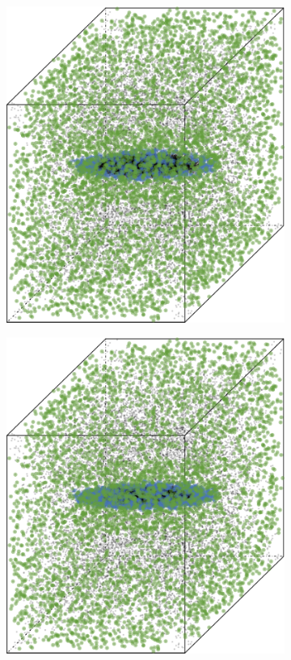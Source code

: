\begin{figure}
\begin{subfigure}{0.23\textwidth}
					\includegraphics[keepaspectratio=true, width=\textwidth, height=0.23\textheight]{discussion/img/baakman_1_60000_anisotropy.png}
					\caption{}
					\label{fig:discussion:anisotropy:baakman1}
				\end{subfigure}	
				\subfigvspace
				\begin{subfigure}{0.23\textwidth}
					\centering
					\includegraphics[keepaspectratio=true, width=\textwidth, height=0.23\textheight]{discussion/img/baakman_4_60000_anisotropy.png}

\end{subfigure}
\end{figure}
